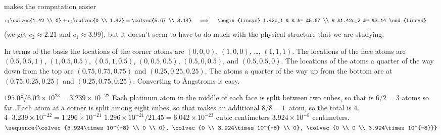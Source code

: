 \begin{ans}{2}
\begin{exparts}
          makes the computation easier
          \begin{equation*}
            c_1\colvec{1.42 \\ 0}+c_2\colvec{0 \\ 1.42}
              =\colvec{5.67 \\ 3.14}
            \quad\implies\quad
            \begin{linsys}{2}
              1.42c_1  &   &         &=  &5.67  \\
                       &   &1.42c_2  &=  &3.14
            \end{linsys}
          \tag*{}\end{equation*}
          (we get $c_2\approx 2.21$ and $c_1\approx 3.99$), but it doesn't
          seem to have to do much with the physical structure that we are
          studying.
      \end{exparts}
    
\end{ans}
\begin{ans}{3}
      In terms of the basis the locations of the corner atoms are
      $(0,0,0)$, $(1,0,0)$, \ldots, $(1,1,1)$.
      The locations of the face atoms are $(0.5,0.5,1)$, $(1,0.5,0.5)$,
      $(0.5,1,0.5)$, $(0,0.5,0.5)$, $(0.5,0,0.5)$, and $(0.5,0.5,0)$.
      The locations of the atoms a quarter of the way down from the top
      are $(0.75,0.75,0.75)$ and $(0.25,0.25,0.25)$.
      The atoms a quarter of the way up from the bottom
      are at $(0.75,0.25,0.25)$ and $(0.25,0.75,0.25)$.
      Converting to \AA ngstroms is easy.
    
\end{ans}
\begin{ans}{4}
      \begin{exparts}
        \partsitem $195.08/6.02\times 10^{23}=3.239\times 10^{-22}$
        \partsitem Each platinum atom in the middle of each face is
          split between two cubes, so that is $6/2=3$ atoms so far.
          Each atom at a corner is split among eight cubes, so
          that makes an additional $8/8=1$~atom, so the total is $4$.
        \partsitem $4\cdot 3.239\times 10^{-22}=1.296\times 10^{-21}$
        \partsitem $1.296\times 10^{-21}/21.45=6.042\times 10^{-23}$ cubic
           centimeters
        \partsitem $3.924\times 10^{-8}$ centimeters.
        \partsitem
            $\sequence{\colvec{3.924\times 10^{-8} \\ 0 \\ 0},
                       \colvec{0 \\ 3.924\times 10^{-8} \\ 0},
                       \colvec{0 \\ 0 \\ 3.924\times 10^{-8}}}$
      \end{exparts}
    
\end{ans}
